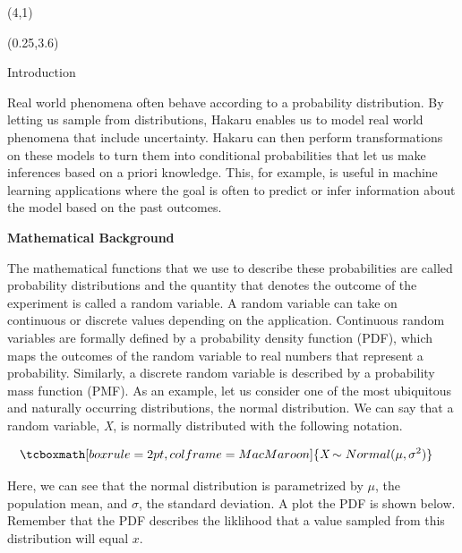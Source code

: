 \documentclass[22pt]{beamer}
\begin{document}
\begin{frame}[fragile]
\begin{textblock}{8}(4,1)
\titlepage
\end{textblock}

\begin{textblock}{5}(0.25,3.6)


\begin{block}{\Large{Introduction}}
\justifying

\bigskip
\scriptsize{Real world phenomena often behave according to a probability distribution. By letting us sample from distributions, Hakaru enables us to model real world phenomena that include uncertainty. Hakaru can then perform transformations on these models to turn them into conditional probabilities that let us make inferences based on a priori knowledge. This, for example, is useful in machine learning applications where the goal is often to predict or infer information about the model based on the past outcomes.}

\bigskip
\normalsize{\textbf{Mathematical Background}}

\bigskip
\scriptsize{The mathematical functions that we use to describe these probabilities are called probability distributions and the quantity that denotes the outcome of the experiment is called a random variable. A random variable can take on continuous or discrete values depending on the application. Continuous random variables are formally defined by a probability density function (PDF), which maps the outcomes of the random variable to real numbers that represent a probability. Similarly, a discrete random variable is described by a probability mass function (PMF). As an example, let us consider one of the most ubiquitous and naturally occurring distributions, the normal distribution. We can say that a random variable, \textit{X}, is normally distributed with the following notation. }

\begin{equation*}
\begin{aligned}
& \tcboxmath[boxrule=2pt,colframe=MacMaroon]{\textit{X} \sim Normal(\mu, \sigma^2)}
\end{aligned}
\end{equation*}

\bigskip
\scriptsize{Here, we can see that the normal distribution is parametrized by $\mu$, the population mean, and $\sigma$, the standard deviation. A plot the PDF is shown below. Remember that the PDF describes the liklihood that a value sampled from this distribution will equal $x$.}


\end{block}
\end{textblock}
\end{frame}
\end{document}
